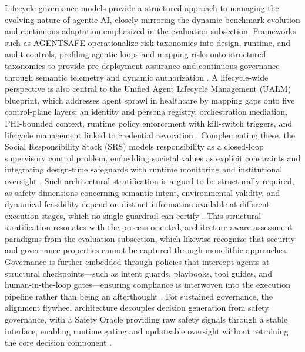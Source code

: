 \documentclass[11pt]{article}
\begin{document}
Lifecycle governance models provide a structured approach to managing the evolving nature of agentic AI, closely mirroring the dynamic benchmark evolution and continuous adaptation emphasized in the evaluation subsection. Frameworks such as AGENTSAFE operationalize risk taxonomies into design, runtime, and audit controls, profiling agentic loops and mapping risks onto structured taxonomies to provide pre-deployment assurance and continuous governance through semantic telemetry and dynamic authorization \cite{ref466}. A lifecycle-wide perspective is also central to the Unified Agent Lifecycle Management (UALM) blueprint, which addresses agent sprawl in healthcare by mapping gaps onto five control-plane layers: an identity and persona registry, orchestration mediation, PHI-bounded context, runtime policy enforcement with kill-switch triggers, and lifecycle management linked to credential revocation \cite{ref467}. Complementing these, the Social Responsibility Stack (SRS) models responsibility as a closed-loop supervisory control problem, embedding societal values as explicit constraints and integrating design-time safeguards with runtime monitoring and institutional oversight \cite{ref468}. Such architectural stratification is argued to be structurally required, as safety dimensions concerning semantic intent, environmental validity, and dynamical feasibility depend on distinct information available at different execution stages, which no single guardrail can certify \cite{ref469}. This structural stratification resonates with the process-oriented, architecture-aware assessment paradigms from the evaluation subsection, which likewise recognize that security and governance properties cannot be captured through monolithic approaches. Governance is further embedded through policies that intercept agents at structural checkpoints---such as intent guards, playbooks, tool guides, and human-in-the-loop gates---ensuring compliance is interwoven into the execution pipeline rather than being an afterthought \cite{ref470}. For sustained governance, the alignment flywheel architecture decouples decision generation from safety governance, with a Safety Oracle providing raw safety signals through a stable interface, enabling runtime gating and updateable oversight without retraining the core decision component \cite{ref471}.
\end{document}
